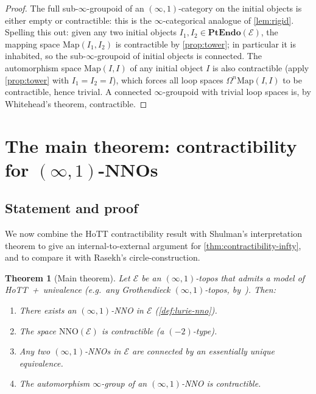 \documentclass[12pt]{article}
\newtheorem{theorem}{Theorem}[section]
\theoremstyle{definition}
\theoremstyle{remark}
\newcommand{\Map}{\mathrm{Map}}
\newcommand{\PtEndo}{\mathbf{PtEndo}}
\begin{document}
\begin{proof}
The full sub-$\infty$-groupoid of an $(\infty,1)$-category on the initial objects is either empty or contractible: this is the $\infty$-categorical analogue of \cref{lem:rigid}. Spelling this out: given any two initial objects $I_{1},I_{2}\in\PtEndo(\mathcal{E})$, the mapping space $\Map(I_{1},I_{2})$ is contractible by \cref{prop:tower}; in particular it is inhabited, so the sub-$\infty$-groupoid of initial objects is connected. The automorphism space $\Map(I,I)$ of any initial object $I$ is also contractible (apply \cref{prop:tower} with $I_{1}=I_{2}=I$), which forces all loop spaces $\Omega^{n}\Map(I,I)$ to be contractible, hence trivial. A connected $\infty$-groupoid with trivial loop spaces is, by Whitehead's theorem, contractible.
\end{proof}

\section{The main theorem: contractibility for \texorpdfstring{$(\infty,1)$}{(infinity,1)}-NNOs}\label{sec:main}

\subsection{Statement and proof}

We now combine the HoTT contractibility result with Shulman's interpretation theorem to give an internal-to-external argument for \cref{thm:contractibility-infty}, and to compare it with Rasekh's circle-construction.

\begin{theorem}[Main theorem]\label{thm:main}
Let $\mathcal{E}$ be an $(\infty,1)$-topos that admits a model of HoTT~+~univalence (e.g.\ any Grothendieck $(\infty,1)$-topos, by~\cite{Shulman2019}). Then:
\begin{enumerate}
  \item There exists an $(\infty,1)$-NNO in $\mathcal{E}$ (\cref{def:lurie-nno}).
  \item The space $\mathrm{NNO}(\mathcal{E})$ is contractible (a $(-2)$-type).
  \item Any two $(\infty,1)$-NNOs in $\mathcal{E}$ are connected by an essentially unique equivalence.
  \item The automorphism $\infty$-group of an $(\infty,1)$-NNO is contractible.
\end{enumerate}
\end{theorem}
\end{document}
